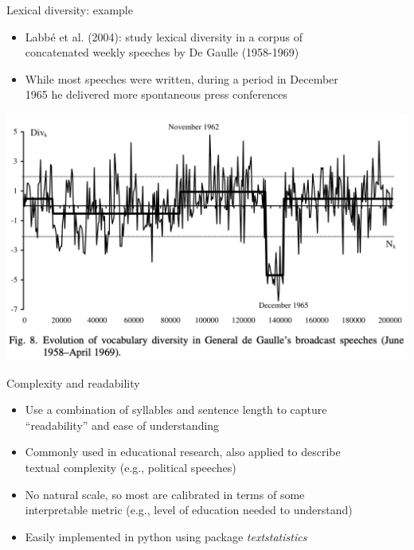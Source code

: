 \documentclass[english]{beamer}
\begin{document}
\begin{frame}{Lexical diversity: example}
\begin{itemize}
\setlength{\itemsep}{0.5em}
\setlength{\itemindent}{-0.5em}
\item Labb\'{e} et al. (2004): study lexical diversity in a corpus of\\
\hspace{-5pt}concatenated weekly speeches by De Gaulle (1958-1969)
\item While most speeches were written, during a period in December\\
\hspace{-5pt}1965 he delivered more spontaneous press conferences
\end{itemize}

\begin{center}
\includegraphics[scale=0.33]{Images/labbe.png}
\end{center}
\end{frame}


\begin{frame}{Complexity and readability}
\begin{itemize}
\setlength{\itemsep}{1.2em}
\setlength{\itemindent}{-0.5em}
\item Use a combination of syllables and sentence length to capture\\
\hspace{-5pt}``readability'' and ease of understanding
\item Commonly used in educational research, also applied to describe\\
\hspace{-5pt}textual complexity (e.g., political speeches)
\item No natural scale, so most are calibrated in terms of some\\
\hspace{-5pt}interpretable metric (e.g., level of education needed to understand)
\item Easily implemented in python using package \textit{textstatistics}
\end {itemize}
\end{frame}
\end{document}
